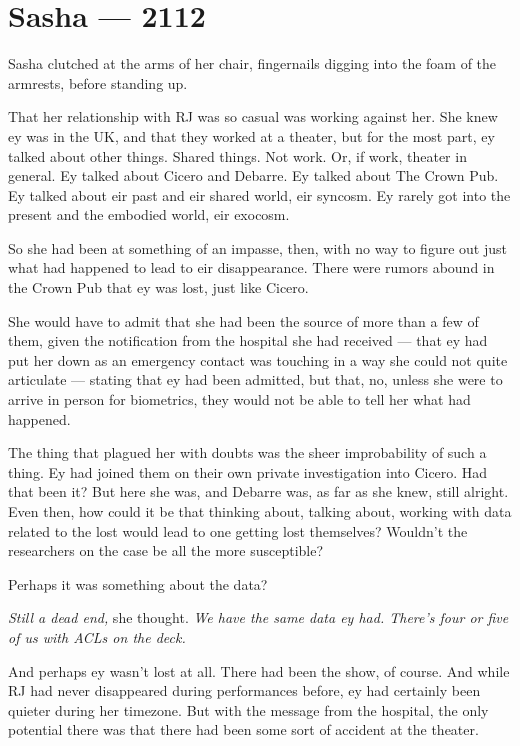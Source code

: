\hypertarget{sasha-2112}{%
\chapter*{Sasha — 2112}\label{sasha-2112}}

Sasha clutched at the arms of her chair, fingernails digging into the foam of the armrests, before standing up.

That her relationship with RJ was so casual was working against her. She knew ey was in the UK, and that they worked at a theater, but for the most part, ey talked about other things. Shared things. Not work. Or, if work, theater in general. Ey talked about Cicero and Debarre. Ey talked about The Crown Pub. Ey talked about eir past and eir shared world, eir syncosm. Ey rarely got into the present and the embodied world, eir exocosm.

So she had been at something of an impasse, then, with no way to figure out just what had happened to lead to eir disappearance. There were rumors abound in the Crown Pub that ey was lost, just like Cicero.

She would have to admit that she had been the source of more than a few of them, given the notification from the hospital she had received — that ey had put her down as an emergency contact was touching in a way she could not quite articulate — stating that ey had been admitted, but that, no, unless she were to arrive in person for biometrics, they would not be able to tell her what had happened.

The thing that plagued her with doubts was the sheer improbability of such a thing. Ey had joined them on their own private investigation into Cicero. Had that been it? But here she was, and Debarre was, as far as she knew, still alright. Even then, how could it be that thinking about, talking about, working with data related to the lost would lead to one getting lost themselves? Wouldn't the researchers on the case be all the more susceptible?

Perhaps it was something about the data?

\emph{Still a dead end,} she thought. \emph{We have the same data ey had. There's four or five of us with ACLs on the deck.}

And perhaps ey wasn't lost at all. There had been the show, of course. And while RJ had never disappeared during performances before, ey had certainly been quieter during her timezone. But with the message from the hospital, the only potential there was that there had been some sort of accident at the theater.

